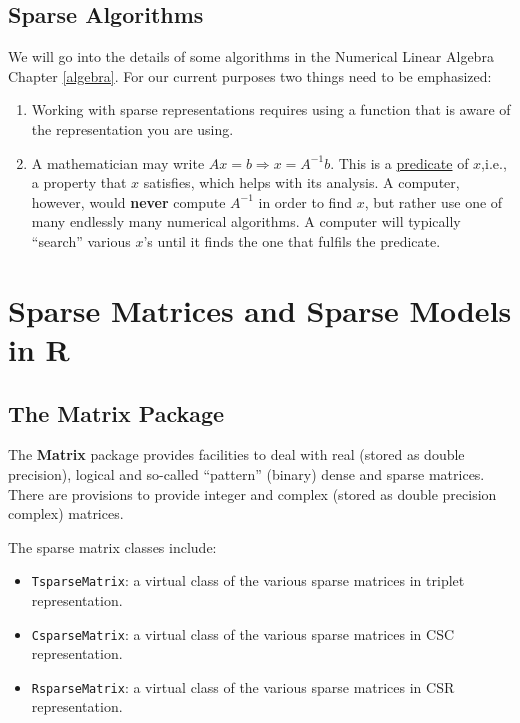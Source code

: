 \documentclass[]{book}
\providecommand{\tightlist}{%
  \setlength{\itemsep}{0pt}\setlength{\parskip}{0pt}}
\theoremstyle{definition}
\theoremstyle{definition}
\theoremstyle{definition}
\theoremstyle{remark}
\begin{document}
\subsection{Sparse Algorithms}\label{sparse-algorithms}

We will go into the details of some algorithms in the Numerical Linear
Algebra Chapter \ref{algebra}. For our current purposes two things need
to be emphasized:

\begin{enumerate}
\def\labelenumi{\arabic{enumi}.}
\item
  Working with sparse representations requires using a function that is
  aware of the representation you are using.
\item
  A mathematician may write \(Ax=b \Rightarrow x=A^{-1}b\). This is a
  \href{https://en.wikipedia.org/wiki/Predicate_(mathematical_logic)}{predicate}
  of \(x\),i.e., a property that \(x\) satisfies, which helps with its
  analysis. A computer, however, would \textbf{never} compute \(A^{-1}\)
  in order to find \(x\), but rather use one of many endlessly many
  numerical algorithms. A computer will typically ``search'' various
  \(x\)'s until it finds the one that fulfils the predicate.
\end{enumerate}

\section{Sparse Matrices and Sparse Models in
R}\label{sparse-matrices-and-sparse-models-in-r}

\subsection{The Matrix Package}\label{the-matrix-package}

The \textbf{Matrix} package provides facilities to deal with real
(stored as double precision), logical and so-called ``pattern'' (binary)
dense and sparse matrices. There are provisions to provide integer and
complex (stored as double precision complex) matrices.

The sparse matrix classes include:

\begin{itemize}
\tightlist
\item
  \texttt{TsparseMatrix}: a virtual class of the various sparse matrices
  in triplet representation.
\item
  \texttt{CsparseMatrix}: a virtual class of the various sparse matrices
  in CSC representation.
\item
  \texttt{RsparseMatrix}: a virtual class of the various sparse matrices
  in CSR representation.
\end{itemize}
\end{document}
